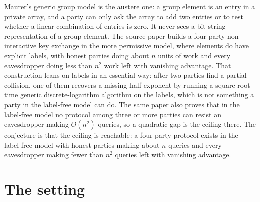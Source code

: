 \documentclass{aicr-conjecture}
\begin{document}

\vspace{0.4em}

\begin{informalconjecture}
Maurer's generic group model is the austere one: a group element is an
entry in a private array, and a party can only ask the array to add two
entries or to test whether a linear combination of entries is zero. It
never sees a bit-string representation of a group element. The source
paper builds a four-party non-interactive key exchange in the more
permissive model, where elements do have explicit labels, with honest
parties doing about $n$ units of work and every eavesdropper doing less
than $n^{2}$ work left with vanishing advantage. That construction leans
on labels in an essential way: after two parties find a partial
collision, one of them recovers a missing half-exponent by running a
square-root-time generic discrete-logarithm algorithm on the labels,
which is not something a party in the label-free model can do. The same
paper also proves that in the label-free model no protocol among three
or more parties can resist an eavesdropper making $O(n^{2})$ queries, so
a quadratic gap is the ceiling there. The conjecture is that the ceiling
is reachable: a four-party protocol exists in the label-free model with
honest parties making about $n$ queries and every eavesdropper making
fewer than $n^{2}$ queries left with vanishing advantage.
\end{informalconjecture}

\section{The setting}\label{sec:setting}
\end{document}
